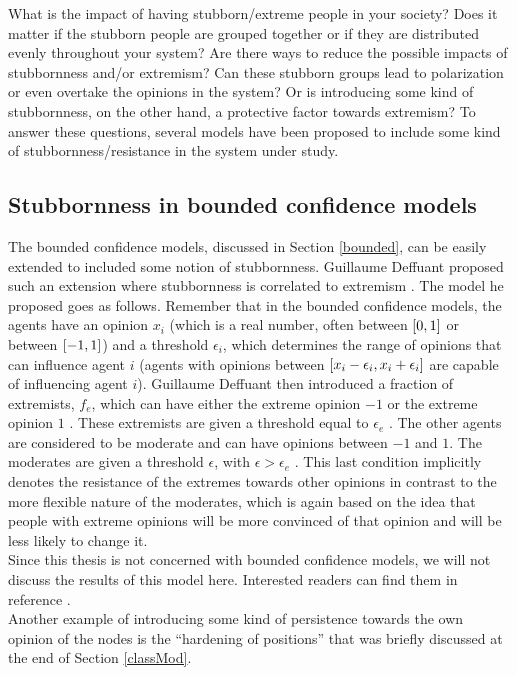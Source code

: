\documentclass[11 pt , letterpaper , twoside , openright]{book}
\begin{document}
\newline
What is the impact of having stubborn/extreme people in your society? Does it matter if the stubborn people are grouped together or if they are distributed evenly throughout your system? Are there ways to reduce the possible impacts of stubbornness and/or extremism? Can these stubborn groups lead to polarization or even overtake the opinions in the system? Or is introducing some kind of stubbornness, on the other hand, a protective factor towards extremism? To answer these questions, several models have been proposed to include some kind of stubbornness/resistance in the system under study.

\subsection{Stubbornness in bounded confidence models}

The bounded confidence models, discussed in Section \ref{bounded}, can be easily extended to included some notion of stubbornness. Guillaume Deffuant proposed such an extension where stubbornness is correlated to extremism \cite{Deffuant2006}. The model he proposed goes as follows. Remember that in the bounded confidence models, the agents have an opinion $x_i$ (which is a real number, often between $\interval{0}{1}$ or between $\interval{-1}{1}$) and a threshold $\epsilon_i$, which determines the range of opinions that can influence agent $i$ (agents with opinions between $\interval{x_i - \epsilon_i}{x_i + \epsilon_i}$ are capable of influencing agent $i$). Guillaume Deffuant then introduced a fraction of extremists, $f_e$, which can have either the extreme opinion $-1$ or the extreme opinion $1$ \cite{Deffuant2006}. These extremists are given a threshold equal to $\epsilon_e$ \cite{Deffuant2006}. The other agents are considered to be moderate and can have opinions between $-1$ and $1$. The moderates are given a threshold $\epsilon$, with $\epsilon > \epsilon_e$ \cite{Deffuant2006}. This last condition implicitly denotes the resistance of the extremes towards other opinions in contrast to the more flexible nature of the moderates, which is again based on the idea that people with extreme opinions will be more convinced of that opinion and will be less likely to change it.\\
Since this thesis is not concerned with bounded confidence models, we will not discuss the results of this model here. Interested readers can find them in reference \cite{Deffuant2006}. \\
\newline
Another example of introducing some kind of persistence towards the own opinion of the nodes is the ``hardening of positions'' that was briefly discussed at the end of Section \ref{classMod}.
\end{document}
